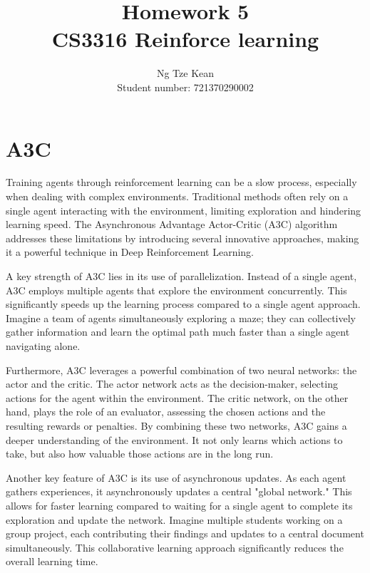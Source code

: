 \documentclass{article}
\title{Homework 5\\CS3316 Reinforce learning}
\author{Ng Tze Kean\\Student number: 721370290002}
\begin{document}
\maketitle

\begin{titlepage}
\end{titlepage}

\section*{A3C}

Training agents through reinforcement learning can be a slow process,
especially when dealing with complex environments. Traditional methods often
rely on a single agent interacting with the environment, limiting exploration
and hindering learning speed. The Asynchronous Advantage Actor-Critic (A3C)
algorithm addresses these limitations by introducing several innovative
approaches, making it a powerful technique in Deep Reinforcement Learning.

A key strength of A3C lies in its use of parallelization. Instead of a single
agent, A3C employs multiple agents that explore the environment concurrently.
This significantly speeds up the learning process compared to a single agent
approach. Imagine a team of agents simultaneously exploring a maze; they can
collectively gather information and learn the optimal path much faster than a
single agent navigating alone.

Furthermore, A3C leverages a powerful combination of two neural networks: the
actor and the critic. The actor network acts as the decision-maker, selecting
actions for the agent within the environment. The critic network, on the other
hand, plays the role of an evaluator, assessing the chosen actions and the
resulting rewards or penalties. By combining these two networks, A3C gains a
deeper understanding of the environment. It not only learns which actions to
take, but also how valuable those actions are in the long run.

Another key feature of A3C is its use of asynchronous updates. As each agent
gathers experiences, it asynchronously updates a central "global network." This
allows for faster learning compared to waiting for a single agent to complete
its exploration and update the network. Imagine multiple students working on a
group project, each contributing their findings and updates to a central
document simultaneously. This collaborative learning approach significantly
reduces the overall learning time.
\end{document}
